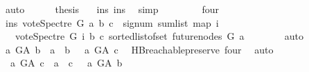 \begin{isabellebody}
\ auto\isanewline
\ \ \ \ \isamarkupfalse%
\ {\isacharquery}{\kern0pt}thesis\ \ \isamarkupfalse%
\ ins\ ins{\isacharunderscore}{\kern0pt}{}\ \isamarkupfalse%
\ simp\isanewline
\ \ \isamarkupfalse%
\isanewline
\ \ \ \ \isamarkupfalse%
\ four\isanewline
\ \ \ \ \isamarkupfalse%
\ \isamarkupfalse%
\ ins{\isacharcolon}{\kern0pt}\ {\isachardoublequoteopen}vote{\isacharunderscore}{\kern0pt}Spectre\ G\ a\ b\ c\ {\isacharequal}{\kern0pt}\ signum\ {\isacharparenleft}{\kern0pt}sum{\isacharunderscore}{\kern0pt}list\ {\isacharparenleft}{\kern0pt}map\ {\isacharparenleft}{\kern0pt}{\isasymlambda}i{\isachardot}{\kern0pt}\isanewline
\ \ \ {\isacharparenleft}{\kern0pt}vote{\isacharunderscore}{\kern0pt}Spectre\ G\ i\ b\ c{\isacharparenright}{\kern0pt}{\isacharparenright}{\kern0pt}\ {\isacharparenleft}{\kern0pt}sorted{\isacharunderscore}{\kern0pt}list{\isacharunderscore}{\kern0pt}of{\isacharunderscore}{\kern0pt}set\ {\isacharparenleft}{\kern0pt}future{\isacharunderscore}{\kern0pt}nodes\ G\ a{\isacharparenright}{\kern0pt}{\isacharparenright}{\kern0pt}{\isacharparenright}{\kern0pt}{\isacharparenright}{\kern0pt}{\isachardoublequoteclose}\isanewline
\ \ \ \ \ \ \isamarkupfalse%
\ auto\isanewline
\ \ \ \ \isamarkupfalse%
\ {\isachardoublequoteopen}{\isasymnot}{\isacharparenleft}{\kern0pt}{\isacharparenleft}{\kern0pt}a\ {\isasymrightarrow}\isactrlsup {\isacharplus}{\kern0pt}\isactrlbsub G{\isacharunderscore}{\kern0pt}A\isactrlesub \ b\ {\isasymor}\ a\ {\isacharequal}{\kern0pt}\ b{\isacharparenright}{\kern0pt}\ {\isasymand}\ {\isacharparenleft}{\kern0pt}{\isasymnot}\ a\ {\isasymrightarrow}\isactrlsup {\isacharplus}{\kern0pt}\isactrlbsub G{\isacharunderscore}{\kern0pt}A\isactrlesub \ c{\isacharparenright}{\kern0pt}{\isacharparenright}{\kern0pt}{\isachardoublequoteclose}\ \isamarkupfalse%
\ HB{}{\isachardot}{\kern0pt}reachable{}{\isacharunderscore}{\kern0pt}preserve\ four\ \isamarkupfalse%
\ auto\isanewline
\ \ \ \ \isamarkupfalse%
\ \isamarkupfalse%
\ {\isachardoublequoteopen}{\isasymnot}\ {\isacharparenleft}{\kern0pt}{\isacharparenleft}{\kern0pt}a\ {\isasymrightarrow}\isactrlsup {\isacharplus}{\kern0pt}\isactrlbsub G{\isacharunderscore}{\kern0pt}A\isactrlesub \ c\ {\isasymor}\ a\ {\isacharequal}{\kern0pt}\ c{\isacharparenright}{\kern0pt}\ {\isasymand}\ {\isacharparenleft}{\kern0pt}{\isasymnot}\ a\ {\isasymrightarrow}\isactrlsup {\isacharplus}{\kern0pt}\isactrlbsub G{\isacharunderscore}{\kern0pt}A\isactrlesub \ b{\isacharparenright}{\kern0pt}{\isacharparenright}{\kern0pt}{\isachardoublequoteclose}\ \isanewline

\end{isabellebody}
